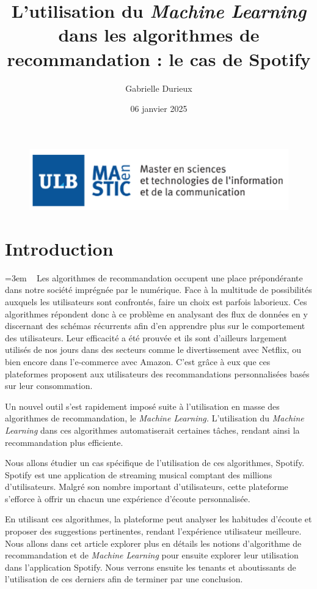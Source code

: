 \documentclass[12pt,a4paper]{article}
\title{\textbf{L'utilisation du \textit{Machine Learning} dans les algorithmes de recommandation : le cas de Spotify}}
\author{Gabrielle \textsc Durieux}
\date{06 janvier 2025}
\begin{document}
\maketitle
\vfill
\begin{figure}[h]
	\centering
	\includegraphics[scale=0.4]{Image2}
\end{figure}
\vfill

\newpage
\tableofcontents
\newpage

\section{Introduction} \emergencystretch=3em
~
Les algorithmes de recommandation occupent une place prépondérante dans notre société imprégnée par le numérique. Face à la multitude de possibilités auxquels les utilisateurs sont confrontés, faire un choix est parfois laborieux. Ces algorithmes répondent donc à ce problème en analysant des flux de données en y discernant des schémas récurrents afin d'en apprendre plus sur le comportement des utilisateurs.
Leur efficacité a été prouvée et ils sont d'ailleurs largement utilisés de nos jours dans des secteurs comme le divertissement avec Netflix, ou bien encore dans l'e-commerce avec Amazon. C'est grâce à eux que ces plateformes proposent aux utilisateurs des recommandations personnalisées basés sur leur consommation.
 
Un nouvel outil s'est rapidement imposé suite à l'utilisation en masse des algorithmes de recommandation, le \textit{Machine Learning.} 
L'utilisation du \textit{Machine Learning} dans ces algorithmes automatiserait certaines tâches, rendant ainsi la recommandation plus efficiente.
 
Nous allons étudier un cas spécifique de l'utilisation de ces algorithmes, Spotify. Spotify est une application de streaming musical comptant des millions d'utilisateurs. Malgré son nombre important d'utilisateurs, cette plateforme s'efforce à offrir un chacun une expérience d'écoute personnalisée. 

En utilisant ces algorithmes, la plateforme peut analyser les habitudes d'écoute et proposer des suggestions pertinentes, rendant l'expérience utilisateur meilleure. 
Nous allons dans cet article explorer plus en détails les notions d'algorithme de recommandation et de \textit{Machine Learning} pour ensuite explorer leur utilisation dans l'application Spotify. Nous verrons ensuite les tenants et aboutissants de l'utilisation de ces derniers afin de terminer par une conclusion.
\end{document}
